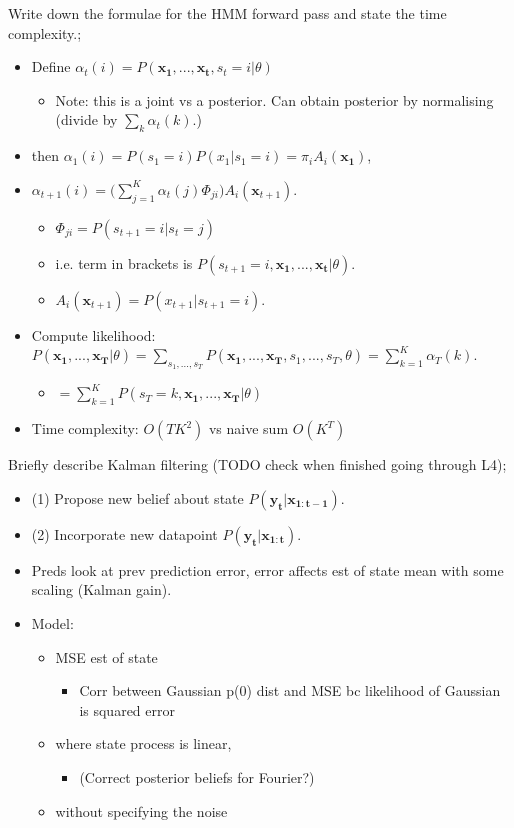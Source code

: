 \documentclass{article}
\begin{document}
Write down the formulae for the HMM forward pass and state the time complexity.; \begin{itemize} \item Define $\alpha_t(i)=P(\mathbf{x_1,...,x_t}, s_t=i|\theta)$ \begin{itemize} \item Note: this is a joint vs a posterior. Can obtain posterior by normalising (divide by $\sum_k \alpha_t(k)$.) \end{itemize} \item then $\alpha_1(i)=P(s_1=i)P(x_1|s_1=i)=\pi_iA_i(\mathbf{x_1})$, \item $\alpha_{t+1}(i)=\big(\sum_{j=1}^K\alpha_t(j)\Phi_{ji}\big)A_i(\mathbf{x}_{t+1})$. \begin{itemize} \item $\Phi_{ji}=P(s_{t+1}=i|s_t=j)$ \item i.e. term in brackets is $ P(s_{t+1}=i, \mathbf{x_1,...,x_t}|\theta)$. \item $A_i(\mathbf{x}_{t+1})=P(x_{t+1}|s_{t+1}=i)$. \end{itemize} \item Compute likelihood: $P(\mathbf{x_1,...,x_T}|\theta)=\sum_{s_1,...,s_T}P(\mathbf{x_1,...,x_T}, s_1,...,s_T,\theta)=\sum_{k=1}^K\alpha_T(k)$. \begin{itemize} \item $=\sum_{k=1}^KP(s_T=k, \mathbf{x_1,...,x_T}|\theta)$ \end{itemize} \item Time complexity: $O(TK^2)$ vs naive sum $O(K^T)$ \end{itemize}

Briefly describe Kalman filtering (TODO check when finished going through L4); \begin{itemize} \item (1) Propose new belief about state $P(\mathbf{y_t|x_{1:t-1}})$. \item (2) Incorporate new datapoint $P(\mathbf{y_t|x_{1:t}})$. \item Preds look at prev prediction error, error affects est of state mean with some scaling (Kalman gain). \item Model: \begin{itemize} \item MSE est of state  \begin{itemize} \item Corr between Gaussian p(0) dist and MSE bc likelihood of Gaussian is squared error \end{itemize} \item where state process is linear,  \begin{itemize} \item (Correct posterior beliefs for Fourier?) \end{itemize} \item without specifying the noise \end{itemize}  \end{itemize}
\end{document}
